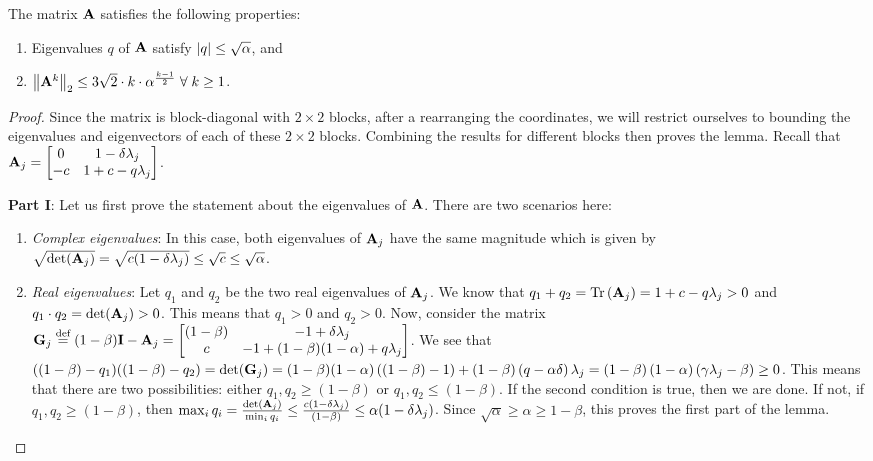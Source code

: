 \begin{lemma}\label{lem:eig-A}
	The matrix $\mathbf{A}$ satisfies the following properties:
	\begin{enumerate}
		\item	Eigenvalues $q$ of $\mathbf{A}$ satisfy $\left|{q}\right| \leq \sqrt{\alpha}$, and
		\item	$ \left\| \mathbf{A}^k \right\|_2\leq 3\sqrt{2} \cdot k \cdot \alpha^{\frac{k-1}{2}} \; \forall \; k \geq 1$.
	\end{enumerate}
\end{lemma}
\begin{proof}
	Since the matrix is block-diagonal with $2\times2$ blocks, after a rearranging the coordinates, we will restrict ourselves to bounding the eigenvalues and eigenvectors of each of these $2\times 2$ blocks. Combining the results for different blocks then proves the lemma. Recall that $\mathbf{A}_j = \begin{bmatrix}
	0 & 1 - \delta \lambda_j \\ -c & 1+c - q \lambda_j
	\end{bmatrix}$.
	
	\textbf{Part I}: Let us first prove the statement about the eigenvalues of $\mathbf{A}$. There are two scenarios here:
	\begin{enumerate}
		\item \emph{Complex eigenvalues}: In this case, both eigenvalues of $\mathbf{A}_j$ have the same magnitude which is given by $\sqrt{\det(\mathbf{A}_j)} = \sqrt{c(1-\delta \lambda_j)}\leq \sqrt{c} \leq \sqrt{\alpha}$.
		\item	\emph{Real eigenvalues}: Let $q_1$ and $q_2$ be the two real eigenvalues of $\mathbf{A}_j$. We know that $q_1+q_2 = \textrm{Tr}\left(\mathbf{A}_j\right) = 1 + c - q\lambda_j > 0$ and $q_1 \cdot q_2 = \det(\mathbf{A}_j) > 0$. This means that $q_1 > 0$ and $q_2 > 0$.
		Now, consider the matrix $\mathbf{G}_j \stackrel{\textrm{def}}{=} (1-\beta) \mathbf{I} - \mathbf{A}_j = \begin{bmatrix}
		 (1-\beta)  & - 1 + \delta \lambda_j \\ c & -1+{ (1-\beta) (1-\alpha)} + q \lambda_j
		\end{bmatrix}$. We see that $( (1-\beta) -q_1)( (1-\beta) -q_2) = \det(\mathbf{G}_j) =  (1-\beta) (1-\alpha)\left( (1-\beta) -1\right) +  (1-\beta)  \left(q-\alpha \delta\right)\lambda_j = (1-\beta)\left(1-\alpha\right)\left(\gamma \lambda_j - \beta\right) \geq 0$. This means that there are two possibilities: either $q_1, q_2 \geq  (1-\beta) $ or $q_1, q_2 \leq  (1-\beta) $. If the second condition is true, then we are done. If not, if $q_1, q_2 \geq  (1-\beta) $, then $\max_i q_i = \frac{\det(\mathbf{A}_j)}{\min_i q_i} \leq \frac{c(1-\delta \lambda_j)}{ (1-\beta) }\leq \alpha (1-\delta \lambda_j)$. Since $\sqrt{\alpha} \geq \alpha \geq 1-\beta$, this proves the first part of the lemma.
	\end{enumerate}


\end{proof}
